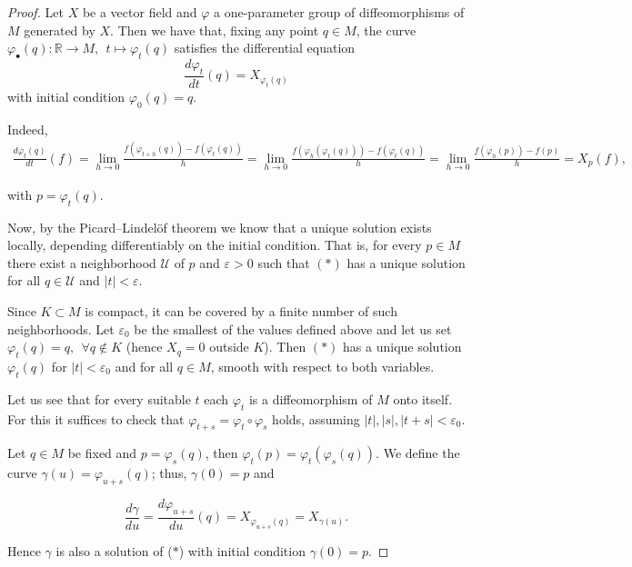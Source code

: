 \begin{proof}
    Let $X$ be a vector field and $\varphi$ a one-parameter group of diffeomorphisms of $M$ generated by $X$. Then we have that, fixing any point $q\in M$, the curve $\varphi_\bullet(q): \mathbb{R}\to M,~~ t\mapsto \varphi_t(q)$ satisfies the differential equation
    \begin{equation*}
        \frac{d\varphi_t}{dt}(q)=X_{\varphi_t(q)}\tag{$\ast$}
    \end{equation*}
    with initial condition $\varphi_0(q)=q$.

    Indeed,
    \begin{align*}
        \frac{d\varphi_t(q)}{dt}(f)=\lim_{h\to 0} \frac{f(\varphi_{t+h}(q))- f(\varphi_t(q))}{h} = \lim_{h\to 0} \frac{f(\varphi_{h}(\varphi_t(q)))- f(\varphi_t(q))}{h} = \lim_{h\to 0} \frac{f(\varphi_{h}(p))- f(p)}{h} = X_p(f),
    \end{align*}

    with $p=\varphi_t(q)$.

    Now, by the Picard--Lindelöf theorem we know that a unique solution exists locally, depending differentiably on the initial condition. That is, for every $ p\in M$ there exist a neighborhood $\mathcal{U}$ of $p$ and $\varepsilon > 0$ such that $(\ast)$ has a unique solution for all $q\in \mathcal{U}$ and $|t|<\varepsilon$.

    Since $K\subset M$ is compact, it can be covered by a finite number of such neighborhoods. Let $\varepsilon_0$ be the smallest of the values defined above and let us set $\varphi_t(q)=q,~~\forall q\notin K$ (hence $X_q=0$ outside $K$). Then $(\ast)$ has a unique solution $\varphi_t(q)$ for $|t|<\varepsilon_0$ and for all $q\in M$, smooth with respect to both variables.

    Let us see that for every suitable $t$ each $\varphi_t$ is a diffeomorphism of $M$ onto itself. For this it suffices to check that $\varphi_{t+s}=\varphi_t\circ \varphi_s$ holds, assuming $|t|,|s|,|t+s|<\varepsilon_0$.

    Let $q\in M$ be fixed and $p=\varphi_s(q)$, then $\varphi_t(p)=\varphi_t(\varphi_s(q))$. We define the curve $\gamma(u)=\varphi_{u+s}(q)$; thus, $\gamma(0)=p$ and

    \begin{equation*}
        \frac{d\gamma}{du}=\frac{d\varphi_{u+s}}{du}(q)=X_{\varphi_{u+s}(q)}=X_{\gamma (u)}.
    \end{equation*}

    Hence $\gamma$ is also a solution of ($\ast$) with initial condition $\gamma(0)=p$.


\end{proof}
